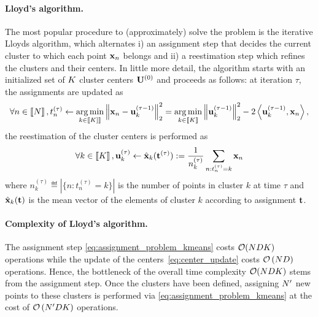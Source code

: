 \paragraph{Lloyd's algorithm.} The most popular procedure to (approximately) 
solve the \kmeans problem is the iterative Lloyds algorithm, which alternates
i) an assignment step that decides the current cluster to which each point ${\mathbf{x}}_n$
belongs and ii) a reestimation step which refines the clusters and their centers.
In little more detail, the algorithm starts with an initialized set of $K$
 cluster centers ${\mathbf{U}}^{(0)}$ and proceeds as follows: at iteration $\tau$,
  the assignments are updated as
\begin{align}
\label{eq:assignment_problem_kmeans}
\forall n\in\left \llbracket N\right \rrbracket, t_n^{(\tau)} \leftarrow \operatorname*{arg\,min}_{k \in \left \llbracket K]\right \rrbracket} \left\|{\mathbf{x}}_{n} - {\mathbf{u}}_{k}^{(\tau-1)}\right\|_2^2 = \operatorname*{arg\,min}_{k \in \left \llbracket K\right \rrbracket} \left\|{\mathbf{u}}_{k}^{(\tau-1)}\right\|_2^2 - 2 \left\langle{\mathbf{u}}_{k}^{(\tau-1)}, {\mathbf{x}}_{n}\right\rangle,
\end{align}
 the reestimation of the cluster centers is performed as
\begin{align}
\label{eq:center_update}
\forall k\in\left \llbracket K\right \rrbracket, {\mathbf{u}}^{(\tau)}_k \leftarrow \hat{{\mathbf{x}}}_k({\mathbf{t}}^{(\tau)}) := \frac{1}{n_k^{(\tau)}} \sum_{n: t^{(\tau)}_n= k} {{\mathbf{x}}_{n}}
\end{align}
where $n_k^{(\tau)}\eqdef |\{n: t^{(\tau)}_n=k\}|$ is the number of points in cluster $k$
at time $\tau$ and $\hat{{\mathbf{x}}}_k({\mathbf{t}})$ is the mean vector of the elements of cluster $k$ according to assignment ${\mathbf{t}}$. %

\paragraph{Complexity of Lloyd's algorithm.} The assignment step \eqref{eq:assignment_problem_kmeans} costs $\mathcal{O}(NDK)$ operations while the update of the centers~\eqref{eq:center_update} costs $\mathcal{O}\left (ND\right )$ operations. Hence, the bottleneck of the overall time complexity $\mathcal{O}(NDK)$ stems from the assignment step. Once the clusters have been defined, assigning $N'$ new points to these clusters is performed via \eqref{eq:assignment_problem_kmeans} at the cost of $\mathcal{O}\left (N'DK \right )$ operations.

